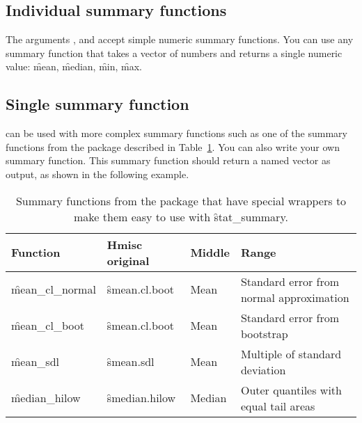 \subsection{Individual summary functions}

The arguments ,  and  accept simple numeric summary functions. You can use any summary function that takes a vector of numbers and returns a single numeric value: \f{mean}, \f{median}, \f{min}, \f{max}.

% 


\subsection{Single summary function}

 can be used with more complex summary functions such as one of the summary functions from the  package \citep{Hmisc} described in Table~\ref{tbl:hmisc}. You can also write your own summary function. This summary function should return a named vector as output, as shown in the following example.

% 


\begin{table}
  \begin{center}
  \begin{tabular}{lllp{2in}}
    \toprule
    Function & Hmisc original & Middle & Range \\
    \midrule 
    \f{mean_cl_normal} & \f{smean.cl.boot} & 
      Mean & Standard error from normal approximation \\
    \f{mean_cl_boot} & \f{smean.cl.boot} & 
      Mean & Standard error from bootstrap \\
    \f{mean_sdl} & \f{smean.sdl} & 
      Mean & Multiple of standard deviation  \\
    \f{median_hilow} & \f{smedian.hilow}  & 
      Median & Outer quantiles with equal tail areas \\
    \bottomrule
  \end{tabular}
  \end{center}
  \caption{Summary functions from the  package that have special wrappers to make them easy to use with \f{stat_summary}.}
  \label{tbl:hmisc}
\end{table}

